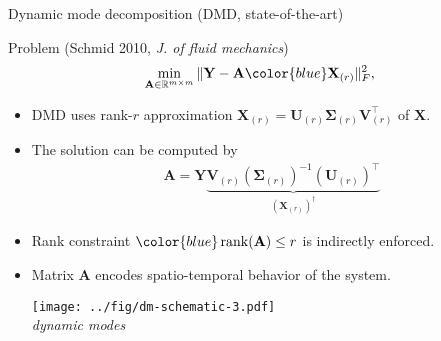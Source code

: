 \documentclass[10pt]{beamer}
\newcommand{\blue}{\color{blue}}
\newcommand{\bX}{\mathbf{X}}
\newcommand{\bY}{\mathbf{Y}}
\newcommand{\bA}{\mathbf{A}}
\newcommand{\bS}{\mathbf{\Sigma}}
\newcommand{\bU}{\mathbf{U}}
\newcommand{\bV}{\mathbf{V}}
\newcommand{\rank}{\mathop{\textrm{\textup{rank}}}}
\begin{document}
\begin{frame}{Dynamic mode decomposition {\small (DMD, state-of-the-art)}}
  \begin{block}{Problem (Schmid 2010, {\em J. of fluid mechanics})}
    \vspace{-0.1in}
    \begin{align*}
      \min_{\bA\in\mathbb{R}^{m\times m}} \Vert \bY - \bA {\blue \bX_{(r)}} \Vert_F^2,
    \end{align*}
  \end{block}
  \begin{itemize}
  \item DMD uses {\blue rank-$r$ approximation $ \bX_{(r)}=\bU_{(r)}\bS_{(r)}\bV_{(r)}^\top$} of $\bX$.
    \vspace{0.15in}
  \item The solution can be computed by
    \begin{align*}
      \bA = \bY \underbrace{\bV_{(r)}(\bS_{(r)})^{-1}(\bU_{(r)})^\top}_{(\bX_{(r)})^\dag}
    \end{align*}
  \item Rank constraint $\blue \rank(\bA)\leq r$ is indirectly enforced.
    \vspace{0.15in}
  \item Matrix $\mathbf{A}$ encodes spatio-temporal behavior of the system.
    \begin{center}
      \texttt{[image: ../fig/dm-schematic-3.pdf]}\\
      {\em\blue dynamic modes}
    \end{center}
  \end{itemize}
\end{frame}
\end{document}
